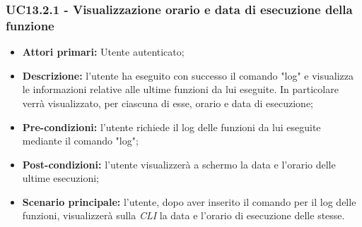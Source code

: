 \subsubsection{UC13.2.1 - Visualizzazione orario e data di esecuzione della funzione}
\begin{itemize}
	\item \textbf{Attori primari:} Utente autenticato;
	\item \textbf{Descrizione:} l'utente ha eseguito con successo il comando "log" e visualizza le informazioni relative alle ultime funzioni da lui eseguite. In particolare verrà visualizzato, per ciascuna di esse, orario e data di esecuzione; 
	\item \textbf{Pre-condizioni:} l'utente richiede il log delle funzioni da lui eseguite mediante il comando "log"; 
	\item \textbf{Post-condizioni:} l'utente visualizzerà a schermo la data e l'orario delle ultime esecuzioni;
	\item \textbf{Scenario principale:} l'utente, dopo aver inserito il comando per il log delle funzioni, visualizzerà sulla \textit{CLI\glo} la data e l'orario di esecuzione delle stesse.
\end{itemize}